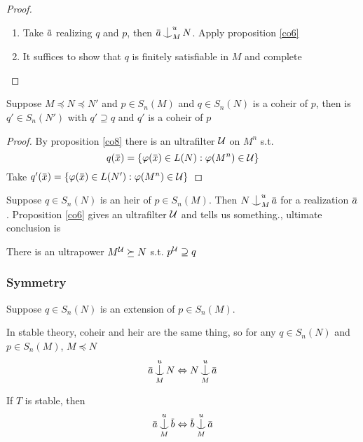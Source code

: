 \documentclass[11pt]{article}
\begin{document}
\begin{proof}
\begin{enumerate}
\item Take \(\bara\) realizing \(q\) and \(p\), then \(\bara\ind_M^uN\). Apply proposition \ref{co6}
\item It suffices to show that \(q\) is finitely satisfiable in \(M\) and complete
\end{enumerate}
\end{proof}

\begin{corollary}
\label{co9}
Suppose \(M\preceq N\preceq N'\) and \(p\in S_n(M)\) and \(q\in S_n(N)\) is a coheir of \(p\), then
is \(q'\in S_n(N')\) with \(q'\supseteq q\) and \(q'\) is a coheir of \(p\)
\end{corollary}

\begin{proof}
By proposition \ref{co8} there is an ultrafilter \(\mathcal{U}\) on \(M^n\) s.t.
\begin{equation*}
q(\barx)=\{\varphi(\barx)\in L(N):\varphi(M^n)\in\calu\}
\end{equation*}
Take \(q'(\barx)=\{\varphi(\barx)\in L(N'):\varphi(M^n)\in\calu\}\)
\end{proof}

\begin{remark}
Suppose \(q\in S_n(N)\) is an heir of \(p\in S_n(M)\). Then \(N\ind_M^u\bara\) for a
realization \(\bara\). Proposition \ref{co6} gives an ultrafilter \(\mathcal{U}\) and tells us something.,
ultimate conclusion is

There is an ultrapower \(M^{\mathcal{U}}\succeq N\) s.t. \(p^{\mathcal{U}}\supseteq q\)
\end{remark}
\subsubsection{Symmetry}
\label{sec:org38e4ac4}
Suppose \(q\in S_n(N)\) is an extension of \(p\in S_n(M)\).

In stable theory, coheir and heir are the same thing, so for any \(q\in S_n(N)\)
and \(p\in S_n(M)\), \(M\preceq N\)
\begin{equation*}
\bara\ind_M^uN\Leftrightarrow N\ind_M^u\bara
\end{equation*}
\begin{theorem}[]
If \(T\) is stable, then
\begin{equation*}
\bara\ind_M^u\barb\Leftrightarrow\barb\ind_M^u\bara
\end{equation*}
\end{theorem}
\end{document}
